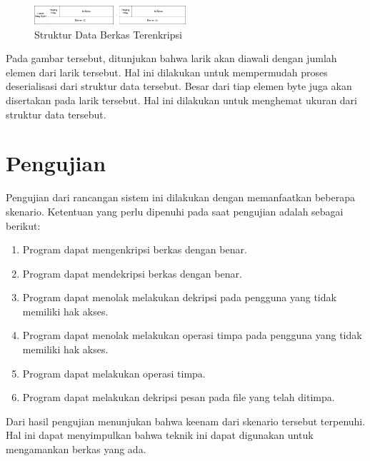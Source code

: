 \documentclass[conference]{IEEEtran}
\begin{document}
\begin{figure}[htbp]
    \centerline{\includegraphics[width=0.5\textwidth]{res/bytes.array.png}}
    \caption{Struktur Data Berkas Terenkripsi}
    \label{fig:bytes.array}
\end{figure}

Pada gambar tersebut, ditunjukan bahwa larik akan diawali dengan jumlah elemen dari larik tersebut. Hal ini dilakukan untuk mempermudah proses deserialisasi dari struktur data tersebut. Besar dari tiap elemen byte juga akan disertakan pada larik tersebut. Hal ini dilakukan untuk menghemat ukuran dari struktur data tersebut.

\section{Pengujian}

Pengujian dari rancangan sistem ini dilakukan dengan memanfaatkan beberapa skenario. Ketentuan yang perlu dipenuhi pada saat pengujian adalah sebagai berikut:
\begin{enumerate}
    \item Program dapat mengenkripsi berkas dengan benar.
    \item Program dapat mendekripsi berkas dengan benar.
    \item Program dapat menolak melakukan dekripsi pada pengguna yang tidak memiliki hak akses.
    \item Program dapat menolak melakukan operasi timpa pada pengguna yang tidak memiliki hak akses.
    \item Program dapat melakukan operasi timpa.
    \item Program dapat melakukan dekripsi pesan pada file yang telah ditimpa.
\end{enumerate}

Dari hasil pengujian menunjukan bahwa keenam dari skenario tersebut terpenuhi. Hal ini dapat menyimpulkan bahwa teknik ini dapat digunakan untuk mengamankan berkas yang ada.
\end{document}
